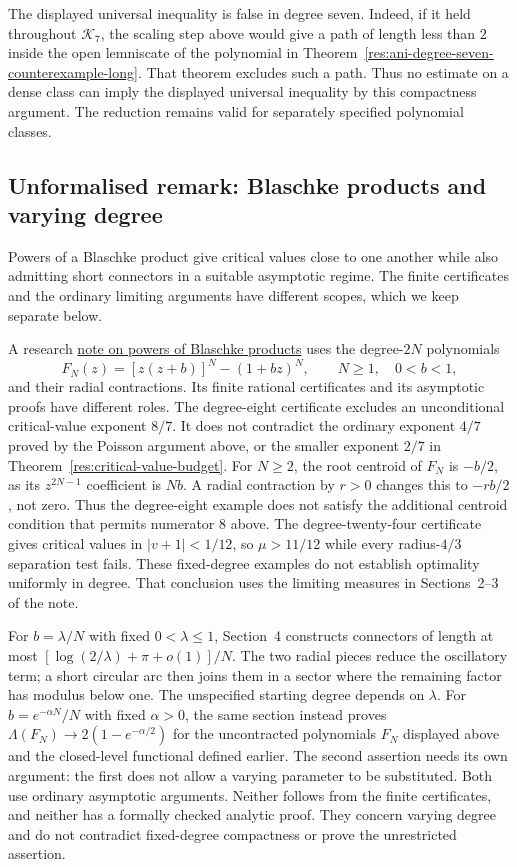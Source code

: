 \documentclass[11pt]{article}
\begin{document}
The displayed universal inequality is false in degree seven. Indeed,
if it held throughout $\mathcal K_7$, the scaling step above would give
a path of length less than $2$ inside the open lemniscate of the
polynomial in Theorem~\ref{res:ani-degree-seven-counterexample-long}.
That theorem excludes such a path. Thus no estimate on a dense class can
imply the displayed universal inequality by this compactness argument.
The reduction remains valid for separately specified polynomial classes.

\subsection*{Unformalised remark: Blaschke products and varying degree}
\hypertarget{blaschke-product-examples}{}
Powers of a Blaschke product give critical values close to one another
while also admitting short connectors in a suitable asymptotic regime.
The finite certificates and the ordinary limiting arguments have
different scopes, which we keep separate below.

A research
\href{https://github.com/wcook04/plectis-erdos/blob/f36a98bf3d3e6f65f1074e3b800e3293d5b8a51a/ErdosProblems/Erdos1041/BlaschkePowerCriticalSpectra.md}{note on powers of Blaschke products}
uses the degree-$2N$ polynomials
\[
 F_N(z)=[z(z+b)]^N-(1+bz)^N,\qquad N\ge1,\quad 0<b<1,
\]
and their radial contractions. Its finite rational certificates and
its asymptotic proofs have different roles. The degree-eight certificate
excludes an unconditional critical-value exponent $8/7$. It does not
contradict the ordinary exponent $4/7$ proved by the Poisson argument above,
or the smaller exponent $2/7$ in Theorem~\ref{res:critical-value-budget}.
For $N\ge2$, the root centroid of $F_N$ is $-b/2$, as its
$z^{2N-1}$ coefficient is $Nb$. A radial contraction by $r>0$ changes
this to $-rb/2$, not zero. Thus the degree-eight example does not satisfy
the additional centroid condition that permits numerator $8$ above. The degree-twenty-four certificate gives critical values in
$|v+1|<1/12$, so $\mu>11/12$ while every radius-$4/3$ separation test
fails. These fixed-degree examples do not establish optimality uniformly
in degree. That conclusion uses the limiting measures in Sections~2--3
of the note.

For $b=\lambda/N$ with fixed $0<\lambda\le1$, Section~4 constructs
connectors of length at most
$[\log(2/\lambda)+\pi+o(1)]/N$. The two radial pieces reduce the
oscillatory term; a short circular arc then joins them in a sector where
the remaining factor has modulus below one. The unspecified starting
degree depends on $\lambda$. For $b=e^{-\alpha N}/N$ with fixed
$\alpha>0$, the same section instead proves
$\Lambda(F_N)\to2(1-e^{-\alpha/2})$ for the uncontracted polynomials
$F_N$ displayed above and the closed-level functional defined earlier.
The second assertion needs its own argument: the first does not allow
a varying parameter to be substituted. Both use ordinary asymptotic arguments. Neither follows from the
finite certificates, and neither has a formally checked analytic proof. They concern varying degree and do not contradict fixed-degree
compactness or prove the unrestricted assertion.
\end{document}
